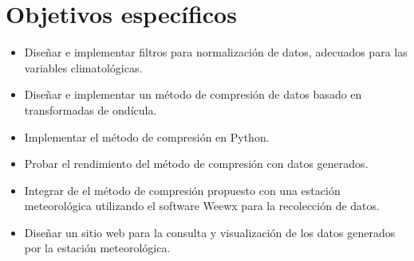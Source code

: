 \section{Objetivos específicos}

\begin{itemize}
   \item Diseñar e implementar filtros para normalización de datos, adecuados para las variables climatológicas.
   \item Diseñar e implementar un método de compresión de datos basado en transformadas de ondícula.
   \item Implementar el método de compresión en Python.
   \item Probar el rendimiento del método de compresión con datos generados.
   \item Integrar de el método de compresión propuesto con una estación meteorológica utilizando el software Weewx para la recolección de datos.
   \item Diseñar un sitio web para la consulta y visualización de los datos generados por la estación meteorológica.
\end{itemize}
